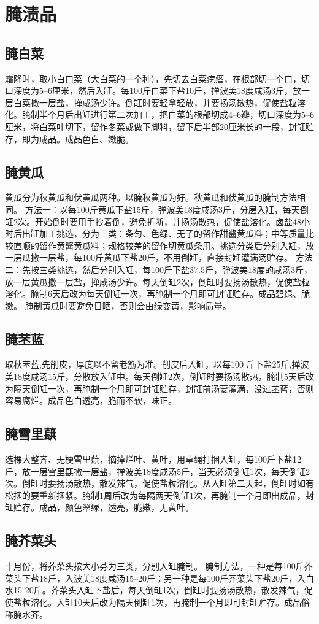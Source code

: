 \documentclass{ctexbook}
\begin{document}
\section{腌渍品}
\subsection{腌白菜}	
霜降时，取小白口菜（大白菜的一个种），先切去白菜疙瘩，在根部切一个口，切口深度为5--6厘米，然后入缸。每100斤白菜下盐10斤，掸波美18度咸汤3斤，放一层白菜撒一层盐，掸咸汤少许。倒缸时要轻拿轻放，并要扬汤散热，促使盐粒溶化。腌制半个月后出缸进行第二次加工，把白菜的根部切成4--6瓣，切口深度为5--6厘米，将白菜叶切下，留作冬菜或做下脚料，留下后半部20厘米长的一段，封缸贮存，即为成品。成品色白、嫩脆。
\subsection{腌黄瓜}
黄瓜分为秋黄瓜和伏黄瓜两种。以腌秋黄瓜为好。秋黄瓜和伏黄瓜的腌制方法相同。
方法一：以每100斤黄瓜下盐15斤，弹波美18度咸汤3斤，分层入缸，每天倒缸2次。开始倒时要用手抄着倒，避免折断，并扬汤散热，促使盐溶化。卤盐48小时后出缸加工挑选，分为三类：条匀、色绿、无子的留作甜酱黄瓜料；中等质量比较直顺的留作黄酱黄瓜料；规格较差的留作切黄瓜条用。挑选分类后分别入缸，放一层瓜撒一层盐，每100斤黄瓜下盐20斤，不用倒缸，直接封缸灌满汤贮存。
方法二：先按三类挑选，然后分别入缸，每100斤下盐37.5斤，弹波美18度的咸汤3斤，放一层黄瓜撒一层盐，掸咸汤少许。每天倒缸2次，倒缸时要扬汤散热，促使盐粒溶化。腌制6天后改为每天倒缸一次，再腌制一个月即可封缸贮存。成品碧绿、脆嫩。
腌制黄瓜时要避免日晒，否则会由绿变黄，影响质量。
\subsection{腌苤蓝}
取秋苤蓝,先削皮，厚度以不留老筋为准。削皮后入缸，以每100
斤下盐25斤,掸波美18度咸汤15斤，分散放入缸中。每天倒缸2次，倒缸时要扬汤散热，腌制5天后改为隔天倒缸一次，再腌制一个月即可封缸贮存，封缸前汤要灌满，没过苤蓝，否则容易腐烂。成品色白透亮，脆而不软，味正。
\subsection{腌雪里蕻}
选棵大整齐、无梗雪里蕻，摘掉烂叶、黄叶，用草绳打捆入缸，每100斤下盐12斤，放一层雪里蕻撒一层盐，掸波美18度咸汤5斤，当天必须倒缸1次，每天倒缸2次。倒缸时要扬汤散热，散发辣气，促使盐粒溶化。从入缸第二天起，倒缸时如有松捆的要重新捆紧。腌制1周后改为每隔两天倒缸1次，再腌制一个月即出成品，封缸贮存。成品，颜色翠绿，透亮，脆嫩，无黄叶。
\subsection{腌芥菜头}
十月份，将芥菜头按大小芬为三类，分别入缸腌制。
腌制方法，一种是每100斤芥菜头下盐18斤，入波美18度咸汤15--20斤；另一种是每100斤芥菜头下盐20斤，入白水15-20斤。芥菜头入缸下盐后，每天倒缸1次，倒缸时要扬汤散热，散发辣气，促使盐粒溶化。入缸10天后改为隔天倒缸1次，再腌制一个月即可封缸贮存。成品俗称腌水芥。
\end{document}
